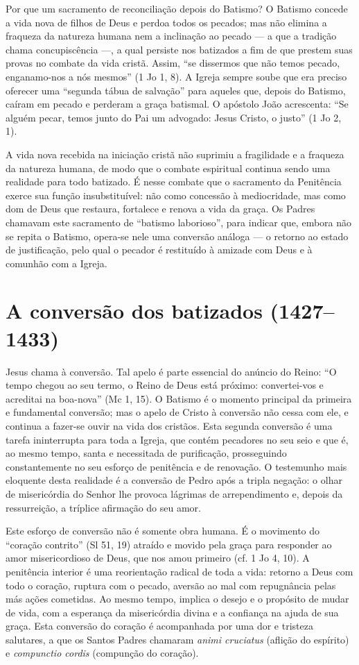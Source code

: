 Por que um sacramento de reconciliação depois do Batismo? O Batismo concede a vida nova de filhos de Deus e perdoa todos os pecados; mas não elimina a fraqueza da natureza humana nem a inclinação ao pecado --- a que a tradição chama concupiscência ---, a qual persiste nos batizados a fim de que prestem suas provas no combate da vida cristã. Assim, ``se dissermos que não temos pecado, enganamo-nos a nós mesmos'' (1 Jo 1, 8). A Igreja sempre soube que era preciso oferecer uma ``segunda tábua de salvação'' para aqueles que, depois do Batismo, caíram em pecado e perderam a graça batismal. O apóstolo João acrescenta: ``Se alguém pecar, temos junto do Pai um advogado: Jesus Cristo, o justo'' (1 Jo 2, 1).

A vida nova recebida na iniciação cristã não suprimiu a fragilidade e a fraqueza da natureza humana, de modo que o combate espiritual continua sendo uma realidade para todo batizado. É nesse combate que o sacramento da Penitência exerce sua função insubstituível: não como concessão à mediocridade, mas como dom de Deus que restaura, fortalece e renova a vida da graça. Os Padres chamavam este sacramento de ``batismo laborioso'', para indicar que, embora não se repita o Batismo, opera-se nele uma conversão análoga --- o retorno ao estado de justificação, pelo qual o pecador é restituído à amizade com Deus e à comunhão com a Igreja.

\section{A conversão dos batizados (1427--1433)}

Jesus chama à conversão. Tal apelo é parte essencial do anúncio do Reino: ``O tempo chegou ao seu termo, o Reino de Deus está próximo: convertei-vos e acreditai na boa-nova'' (Mc 1, 15). O Batismo é o momento principal da primeira e fundamental conversão; mas o apelo de Cristo à conversão não cessa com ele, e continua a fazer-se ouvir na vida dos cristãos. Esta segunda conversão é uma tarefa ininterrupta para toda a Igreja, que contém pecadores no seu seio e que é, ao mesmo tempo, santa e necessitada de purificação, prosseguindo constantemente no seu esforço de penitência e de renovação. O testemunho mais eloquente desta realidade é a conversão de Pedro após a tripla negação: o olhar de misericórdia do Senhor lhe provoca lágrimas de arrependimento e, depois da ressurreição, a tríplice afirmação do seu amor.

Este esforço de conversão não é somente obra humana. É o movimento do ``coração contrito'' (Sl 51, 19) atraído e movido pela graça para responder ao amor misericordioso de Deus, que nos amou primeiro (cf. 1 Jo 4, 10). A penitência interior é uma reorientação radical de toda a vida: retorno a Deus com todo o coração, ruptura com o pecado, aversão ao mal com repugnância pelas más ações cometidas. Ao mesmo tempo, implica o desejo e o propósito de mudar de vida, com a esperança da misericórdia divina e a confiança na ajuda de sua graça. Esta conversão do coração é acompanhada por uma dor e tristeza salutares, a que os Santos Padres chamaram \emph{animi cruciatus} (aflição do espírito) e \emph{compunctio cordis} (compunção do coração).

